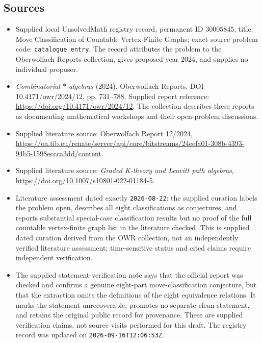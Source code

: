 \documentclass[11pt]{article}
\begin{document}
\subsection{Sources}
\begin{itemize}
\item Supplied local UnsolvedMath registry record, permanent ID \(30005845\), title: Move Classification of Countable Vertex-Finite Graphs; exact source problem code: \texttt{catalogue entry}. The record attributes the problem to the Oberwolfach Reports collection, gives proposed year 2024, and supplies no individual proposer.
\item \emph{Combinatorial \(*\)-algebras} (2024), Oberwolfach Reports, DOI 10.4171/owr/2024/12, pp. 731--788. Supplied report reference: \url{https://doi.org/10.4171/owr/2024/12}. The collection describes these reports as documenting mathematical workshops and their open-problem discussions.
\item Supplied literature source: Oberwolfach Report 12/2024, \url{https://oa.tib.eu/renate/server/api/core/bitstreams/24eefa01-308b-4393-94b5-1598eccca3dd/content}.
\item Supplied literature source: \emph{Graded K-theory and Leavitt path algebras}, \url{https://doi.org/10.1007/s10801-022-01184-5}.
\item Literature assessment dated exactly \texttt{2026-08-22}: the supplied curation labels the problem open, describes all eight classifications as conjectures, and reports substantial special-case classification results but no proof of the full countable vertex-finite graph list in the literature checked. This is supplied dated curation derived from the OWR collection, not an independently verified literature assessment; time-sensitive status and cited claims require independent verification.
\item The supplied statement-verification note says that the official report was checked and confirms a genuine eight-part move-classification conjecture, but that the extraction omits the definitions of the eight equivalence relations. It marks the statement unrecoverable, promotes no separate clean statement, and retains the original public record for provenance. These are supplied verification claims, not source visits performed for this draft. The registry record was updated on \texttt{2026-09-16T12:06:53Z}.
\end{itemize}
\end{document}
